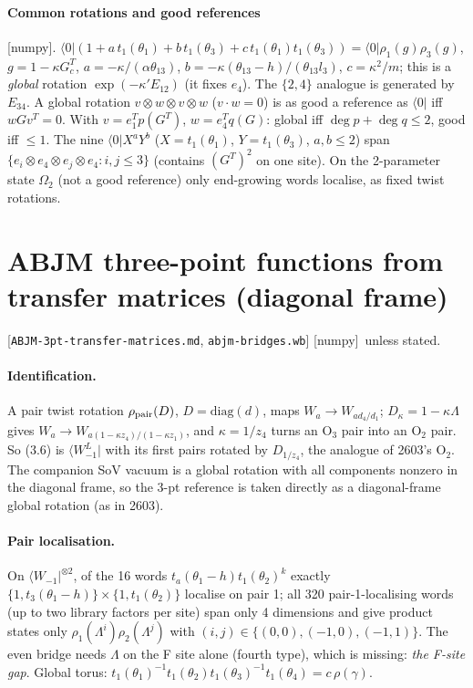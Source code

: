 \documentclass[11pt]{article}
\newcommand{\nb}[1]{\texttt{#1}}
\newcommand{\npy}{\textsf{[numpy]}}
\newcommand{\bra}[1]{\langle#1|}
\begin{document}
\paragraph{Common rotations and good references} \npy.
$\bra0(1+a\,t_1(\theta_1)+b\,t_1(\theta_3)+c\,t_1(\theta_1)t_1(\theta_3))=\bra0\rho_1(g)\rho_3(g)$, $g=1-\kappa G_c^T$,
$a=-\kappa/(\alpha\theta_{13})$, $b=-\kappa(\theta_{13}-h)/(\theta_{13}l_3)$, $c=\kappa^2/m$; this is a \emph{global}
rotation $\exp(-\kappa'E_{12})$ (it fixes $e_4$). The $\{2,4\}$ analogue is generated by $E_{34}$. A global rotation
$v\otimes w\otimes v\otimes w$ ($v\cdot w=0$) is as good a reference as $\bra0$ iff $wGv^T=0$. With $v=e_1^Tp(G^T)$,
$w=e_4^Tq(G)$: global iff $\deg p+\deg q\le2$, good iff $\le1$. The nine $\bra0X^aY^b$ ($X=t_1(\theta_1)$, $Y=t_1(\theta_3)$,
$a,b\le2$) span $\{e_i\otimes e_4\otimes e_j\otimes e_4:i,j\le3\}$ (contains $(G^T)^2$ on one site). On the 2-parameter state
$\Omega_2$ (not a good reference) only end-growing words localise, as fixed twist rotations.

\section{ABJM three-point functions from transfer matrices (diagonal frame)}\label{sec:3pt}

[\nb{ABJM-3pt-transfer-matrices.md}, \nb{abjm-bridges.wb}] \npy\ unless stated.

\paragraph{Identification.} A pair twist rotation $\rho_{\rm pair}(D)$, $D=\mathrm{diag}(d)$, maps $W_a\to W_{ad_4/d_1}$;
$D_\kappa=1-\kappa\Lambda$ gives $W_a\to W_{a(1-\kappa z_4)/(1-\kappa z_1)}$, and $\kappa=1/z_4$ turns an O$_3$ pair into an
O$_2$ pair. So (3.6) is $\bra{W_{-1}^L}$ with its first pairs rotated by $D_{1/z_4}$, the analogue of 2603's O$_2$. The
companion SoV vacuum is a global rotation with all components nonzero in the diagonal frame, so the 3-pt reference is
taken directly as a diagonal-frame global rotation (as in 2603).

\paragraph{Pair localisation.} On $\bra{W_{-1}}^{\otimes2}$, of the 16 words $t_a(\theta_1-h)t_1(\theta_2)^k$ exactly
$\{1,t_3(\theta_1-h)\}\times\{1,t_1(\theta_2)\}$ localise on pair 1; all 320 pair-1-localising words (up to two library factors
per site) span only 4 dimensions and give product states only $\rho_1(\Lambda^i)\rho_2(\Lambda^j)$ with
$(i,j)\in\{(0,0),(-1,0),(-1,1)\}$. The even bridge needs $\Lambda$ on the F site alone (fourth type), which is missing:
\emph{the F-site gap}. Global torus: $t_1(\theta_1)^{-1}t_1(\theta_2)t_1(\theta_3)^{-1}t_1(\theta_4)=c\,\rho(\gamma)$.
\end{document}
